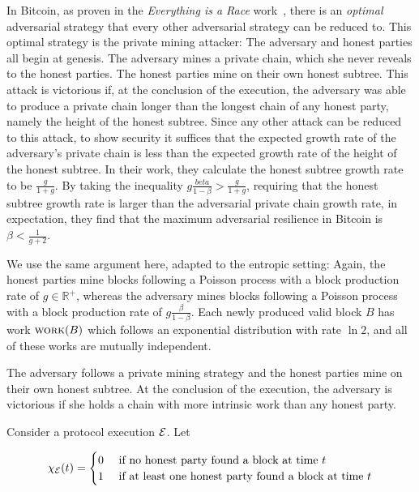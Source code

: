 In Bitcoin,
as proven in the \emph{Everything is a Race} work~\cite[Theorem 5.1]{eiar}, there is
an \emph{optimal} adversarial strategy that every other adversarial strategy can be reduced to.
This optimal strategy is the private mining attacker: The adversary and honest parties
all begin at genesis. The adversary mines a private chain, which she never reveals to the honest
parties. The honest parties mine on their own honest subtree. This attack is victorious if,
at the conclusion of the execution, the adversary was able to produce a private chain longer
than the longest chain of any honest party, namely the height of the honest subtree. Since
any other attack can be reduced to this attack, to show security it suffices that the expected
growth rate of the adversary's private chain is less than the expected growth rate of the
height of the honest subtree. In their work, they calculate the honest subtree growth rate to be
$\frac{g}{1 + g}$. By taking the inequality $g \frac{beta}{1 - \beta} > \frac{g}{1 + g}$,
requiring that the honest subtree growth rate is larger than the adversarial private chain
growth rate, in expectation, they find that the maximum adversarial resilience in Bitcoin is
$\beta < \frac{1}{g + 2}$.

We use the same argument here, adapted to the entropic setting: Again, the honest parties mine
blocks following a Poisson process with a block production rate of $g \in \mathbb{R}^+$, whereas
the adversary mines blocks following a Poisson process with a block production rate of
$g \frac{\beta}{1 - \beta}$. Each newly produced valid block $B$ has work $\textsc{work}(B)$ which follows
an exponential distribution with rate $\ln2$, and all of these works are mutually independent.


The adversary follows a private
mining strategy and the honest parties mine on their own honest subtree. At the conclusion of the
execution, the adversary is victorious if she holds a chain with more intrinsic work than any honest
party.

Consider a protocol execution $\mathcal{E}$. Let 

\[
  \chi_{\mathcal{E}}(t) = \begin{cases}
    0 & \text{ if no honest party found a block at time } t\\
    1 & \text{ if at least one honest party found a block at time } t
  \end{cases}
\]

